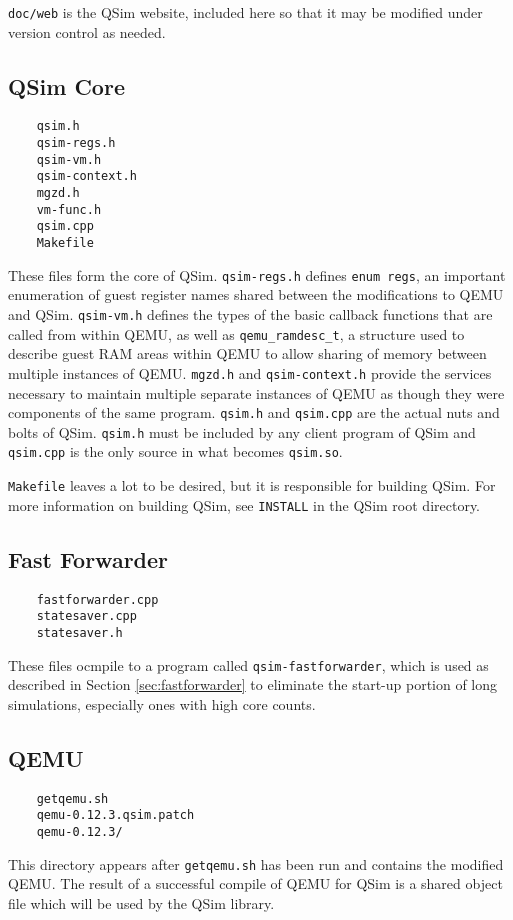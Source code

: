 \documentclass[letterpaper, 10pt]{book}
\begin{document}
\texttt{doc/web} is the QSim website, included here so that it may be modified
under version control as needed.

\subsection{QSim Core}

\begin{verbatim}
    qsim.h
    qsim-regs.h
    qsim-vm.h
    qsim-context.h
    mgzd.h
    vm-func.h
    qsim.cpp
    Makefile
\end{verbatim}
These files form the core of QSim. \texttt{qsim-regs.h} defines 
\texttt{enum regs}, an important enumeration of guest register names shared
between the modifications to QEMU and QSim. \texttt{qsim-vm.h} defines the
types of the basic callback functions that are called from within QEMU, as well
as \texttt{qemu\_ramdesc\_t}, a structure used to describe guest RAM areas
within QEMU to allow sharing of memory between multiple instances of QEMU.
\texttt{mgzd.h} and \texttt{qsim-context.h} provide the services necessary to
maintain multiple separate instances of QEMU as though they were components of
the same program. \texttt{qsim.h} and \texttt{qsim.cpp} are the actual nuts
and bolts of QSim. \texttt{qsim.h} must be included by any client program
of QSim and \texttt{qsim.cpp} is the only source in what becomes
\texttt{qsim.so}.

\texttt{Makefile} leaves a lot to be desired, but it is responsible for
building QSim. For more information on building QSim, see \texttt{INSTALL} in
the QSim root directory. 

\subsection{Fast Forwarder}
\begin{verbatim}
    fastforwarder.cpp
    statesaver.cpp
    statesaver.h
\end{verbatim}
These files ocmpile to a program called \texttt{qsim-fastforwarder}, which is 
used as described in Section \ref{sec:fastforwarder} to eliminate the start-up
portion of long simulations, especially ones with high core counts.

\subsection{QEMU}
\begin{verbatim}
    getqemu.sh
    qemu-0.12.3.qsim.patch
    qemu-0.12.3/
\end{verbatim}
This directory appears after \texttt{getqemu.sh} has been run and contains the
modified QEMU. The result of a successful compile of QEMU for QSim is a shared
object file which will be used by the QSim library.
\end{document}
